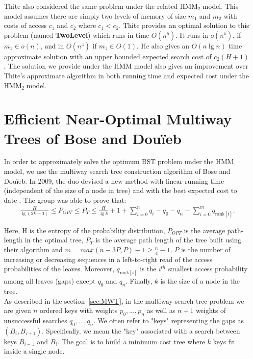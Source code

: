 \documentclass[letterpaper,12pt,titlepage,oneside,final]{book}
\theoremstyle{plain}
\begin{document}
Thite also considered the same problem under the related HMM$_2$ model. This model assumes there are simply two levels of memory of size $m_1$ and $m_2$ with costs of access $c_1$ and $c_2$ where $c_1 < c_2$. Thite provides an optimal solution to this problem (named \textbf{TwoLevel}) which runs in time $O(n^5)$. It runs in $o(n^5)$, if $m_1 \in o(n)$, and in $O(n^4)$ if $m_1 \in O(1)$. He also gives an $O(n\lg n)$ time approximate solution with an upper bounded expected search cost of $c_2(H+1)$. The solution we provide under the HMM model also gives an improvement over Thite's approximate algorithm in both running time and expected cost under the HMM$_2$ model.


\section{Efficient Near-Optimal Multiway Trees of Bose and Dou\"{i}eb}\label{43}

In order to approximately solve the optimum BST problem under the HMM model, we use the multiway search tree construction algorithm of Bose and Dou\"{i}eb. In 2009, the duo devised a new method with linear running time (independent of the size of a node in tree) and with the best expected cost to date \cite{bose2009efficient}. The group was able to prove that:
\begin{align*}
\frac{H}{\lg(2k-1)} \leq P_{OPT} \leq P_T \leq \frac{H}{\lg k} + 1 + \sum_{i=0}^n q_i - q_0 - q_n - \sum_{i=0}^m q_{\text{rank}[i]}.
\end{align*}

Here, H is the entropy of the probability distribution, $P_{OPT}$ is the average path-length in the optimal tree, $P_T$ is the average path length of the tree built using their algorithm and $m=max({n-3P,P})-1 \geq \frac{n}{4} - 1$. $P$ is the number of increasing or decreasing sequences in a left-to-right read of the access probabilities of the leaves. Moreover, $q_{\text{rank}[i]}$ is the $i^{th}$ smallest access probability among all leaves (gaps) except $q_0$ and $q_n$. Finally, $k$ is the size of a node in the tree. \\

As described in the section~\ref{sec:MWT}, in the multiway search tree problem we are given $n$ ordered keys with weights $p_0, ..., p_n$ as well as $n+1$ weights of unsuccessful searches $q_0,...,q_n$. We often refer to "keys" representing the gaps as $(B_{i},B_{i+1})$. Specifically, we mean the "key" associated with a search between keys $B_{i-1}$ and $B_i$. The goal is to build a minimum cost tree where $k$ keys fit inside a single node.\\
 
\end{document}

